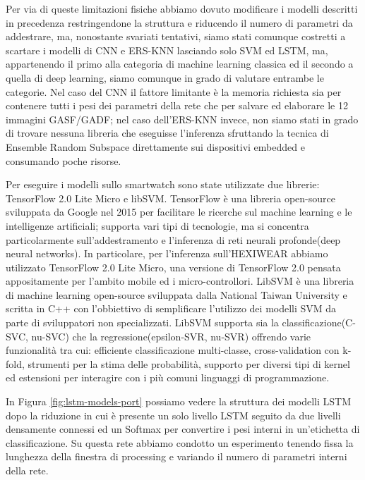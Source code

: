 Per via di queste limitazioni fisiche abbiamo dovuto modificare i modelli descritti in precedenza restringendone la struttura e riducendo il numero di parametri da addestrare, ma, nonostante svariati tentativi, siamo stati comunque costretti a scartare i modelli di CNN e ERS-KNN lasciando solo SVM ed LSTM, ma, appartenendo il primo alla categoria di machine learning classica ed il secondo a quella di deep learning, siamo comunque in grado di valutare entrambe le categorie. Nel caso del CNN il fattore limitante è la memoria richiesta sia per contenere tutti i pesi dei parametri della rete che per salvare ed elaborare le 12 immagini GASF/GADF; nel caso dell'ERS-KNN invece, non siamo stati in grado di trovare nessuna libreria che eseguisse l'inferenza sfruttando la tecnica di Ensemble Random Subspace direttamente sui dispositivi embedded e consumando poche risorse.

Per eseguire i modelli sullo smartwatch sono state utilizzate due librerie: TensorFlow 2.0 Lite Micro e libSVM.
TensorFlow è una libreria open-source sviluppata da Google nel 2015 per facilitare le ricerche sul machine learning e le intelligenze artificiali; supporta vari tipi di tecnologie, ma si concentra particolarmente sull'addestramento e l'inferenza di reti neurali profonde(deep neural networks)\cite{abadi2016tensorflow}. In particolare, per l'inferenza sull'HEXIWEAR abbiamo utilizzato TensorFlow 2.0 Lite Micro, una versione di TensorFlow 2.0 pensata appositamente per l'ambito mobile ed i micro-controllori. 
LibSVM\cite{chang2011libsvm} è una libreria di machine learning open-source sviluppata dalla National Taiwan University e scritta in C++ con l'obbiettivo di semplificare l'utilizzo dei modelli SVM da parte di sviluppatori non specializzati. LibSVM supporta sia la classificazione(C-SVC, nu-SVC) che la regressione(epsilon-SVR, nu-SVR) offrendo varie funzionalità tra cui: efficiente classificazione multi-classe, cross-validation con k-fold, strumenti per la stima delle probabilità, supporto per diversi tipi di kernel ed estensioni per interagire con i più comuni linguaggi di programmazione.

In Figura \ref{fig:lstm-models-port} possiamo vedere la struttura dei modelli LSTM dopo la riduzione in cui è presente un solo livello LSTM seguito da due livelli densamente connessi ed un Softmax per convertire i pesi interni in un'etichetta di classificazione. Su questa rete abbiamo condotto un esperimento tenendo fissa la lunghezza della finestra di processing e variando il numero di parametri interni della rete.

